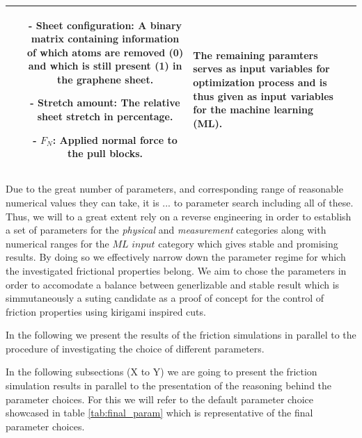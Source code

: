 \begin{table}[H]
\begin{center}
\begin{tabular}{ | c | m{8cm}| m{5cm}|}
\begin{itemize}
      \item[-] Sheet configuration: A binary matrix containing information of which atoms are removed (0) and which is still present (1) in the graphene sheet. 
      \item[-] Stretch amount: The relative sheet stretch in percentage.
      \item[-] $F_N$: Applied normal force to the pull blocks.
    \end{itemize} &
    The remaining paramters serves as input variables for optimization process and is thus given as input variables for the machine learning (ML). 
    \\ \hline
  \end{tabular}
  \end{center}
\end{table}

Due to the great number of parameters, and corresponding range of reasonable numerical values they can take, it is ... to parameter search including all of these. Thus, we will to a great extent rely on a reverse engineering in order to establish a set of parameters for the \textit{physical} and \textit{measurement} categories along with numerical ranges for the $\textit{ML input}$ category which gives stable and promising results. By doing so we effectively narrow down the parameter regime for which the investigated frictional properties belong. We aim to chose the parameters in order to accomodate a balance between generlizable and stable result which is simmutaneously a suting candidate as a proof of concept for the control of friction properties using kirigami inspired cuts. 

In the following we present the results of the friction simulations in parallel to the procedure of investigating the choice of different parameters. 

In the following subsections (X to Y) we are going to present the friction simulation results in parallel to the presentation of the reasoning behind the parameter choices. For this we will refer to the default parameter choice showcased in table \ref{tab:final_param} which is representative of the final parameter choices. 




